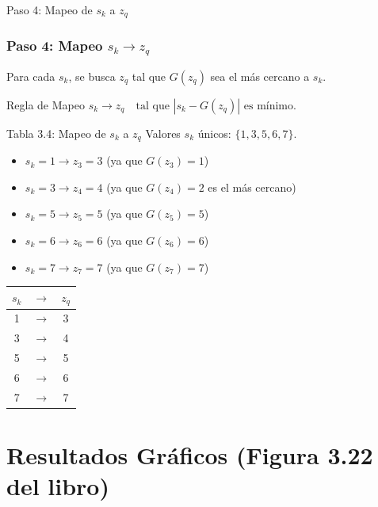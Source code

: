 \documentclass{beamer}
\begin{document}
\begin{frame}{Paso 4: Mapeo de $s_k$ a $z_q$}\footnotesize
\frametitle{Paso 4: Mapeo $s_k \rightarrow z_q$} %
  Para cada $s_k$, se busca $z_q$ tal que $G(z_q)$ sea el más cercano a $s_k$.

  \begin{block}{\footnotesize{Regla de Mapeo}}
    $s_k \rightarrow z_q \quad \text{tal que } |s_k - G(z_q)| \text{ es mínimo.}$
  \end{block}

  \begin{exampleblock}{\footnotesize{Tabla 3.4: Mapeo de $s_k$ a $z_q$}}
    \tiny %
    Valores $s_k$ únicos: $\{1, 3, 5, 6, 7\}$.
    \begin{itemize}
        \item $s_k = 1 \rightarrow z_3=3$ (ya que $G(z_3)=1$)
        \item $s_k = 3 \rightarrow z_4=4$ (ya que $G(z_4)=2$ es el más cercano)
        \item $s_k = 5 \rightarrow z_5=5$ (ya que $G(z_5)=5$)
        \item $s_k = 6 \rightarrow z_6=6$ (ya que $G(z_6)=6$)
        \item $s_k = 7 \rightarrow z_7=7$ (ya que $G(z_7)=7$)
    \end{itemize}
    \centering
    \begin{tabular}{ccc}
        \toprule
        $s_k$ & $\rightarrow$ & $z_q$ \\
        \midrule
        1 & $\rightarrow$ & 3 \\
        3 & $\rightarrow$ & 4 \\
        5 & $\rightarrow$ & 5 \\
        6 & $\rightarrow$ & 6 \\
        7 & $\rightarrow$ & 7 \\
        \bottomrule
    \end{tabular}
  \end{exampleblock}
\end{frame}

\section{Resultados Gráficos (Figura 3.22 del libro)}
\end{document}
